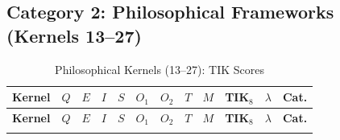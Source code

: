 \documentclass[11pt,a4paper]{article}
\theoremstyle{definition}
\theoremstyle{remark}
\begin{document}
\subsection{Category 2: Philosophical Frameworks (Kernels 13--27)}
\label{sec:cat2}

\begin{longtable}{@{}l|cccccccc|cc|c@{}}
\caption{Philosophical Kernels (13--27): TIK Scores}
\label{tab:philosophical}\\
\toprule
\textbf{Kernel} &
$Q$ & $E$ & $I$ & $S$ & $O_1$ & $O_2$ & $T$ & $M$ &
\textbf{TIK$_8$} & $\lambda$ & \textbf{Cat.} \\
\midrule
\endfirsthead
\toprule
\textbf{Kernel} &
$Q$ & $E$ & $I$ & $S$ & $O_1$ & $O_2$ & $T$ & $M$ &
\textbf{TIK$_8$} & $\lambda$ & \textbf{Cat.} \\
\midrule
\endhead
\bottomrule
\endlastfoot


\end{longtable}
\end{document}
